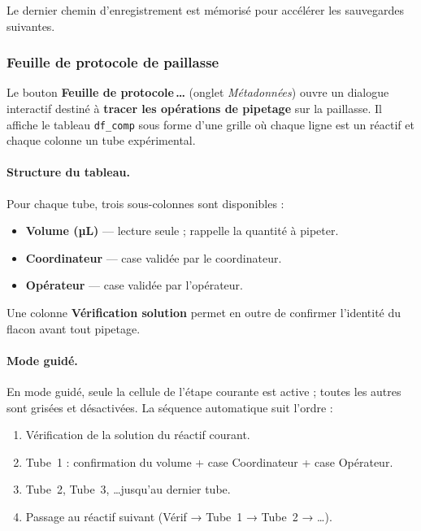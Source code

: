 \documentclass[12pt, a4paper]{article}
\begin{document}
\begin{remarque}
Le dernier chemin d'enregistrement est mémorisé pour accélérer les
sauvegardes suivantes.
\end{remarque}

\subsubsection{Feuille de protocole de paillasse}
\label{subsec:protocole}

Le bouton \textbf{Feuille de protocole\,\ldots} (onglet \textit{Métadonnées})
ouvre un dialogue interactif destiné à \textbf{tracer les opérations de pipetage}
sur la paillasse. Il affiche le tableau \texttt{df\_comp} sous forme d'une grille
où chaque ligne est un réactif et chaque colonne un tube expérimental.

\paragraph{Structure du tableau.}
Pour chaque tube, trois sous-colonnes sont disponibles :

\begin{itemize}
  \item \textbf{Volume (µL)} — lecture seule ; rappelle la quantité à pipeter.
  \item \textbf{Coordinateur } — case validée par le coordinateur.
  \item \textbf{Opérateur } — case validée par l'opérateur.
\end{itemize}

Une colonne \textbf{Vérification solution} permet en outre de confirmer
l'identité du flacon avant tout pipetage.

\paragraph{Mode guidé.}
En mode guidé, seule la cellule de l'étape courante est active ;
toutes les autres sont grisées et désactivées.
La séquence automatique suit l'ordre :

\begin{enumerate}
  \item Vérification de la solution du réactif courant.
  \item Tube~1 : confirmation du volume + case Coordinateur + case Opérateur.
  \item Tube~2, Tube~3, \ldots jusqu'au dernier tube.
  \item Passage au réactif suivant (Vérif → Tube~1 → Tube~2 → \ldots).
\end{enumerate}
\end{document}
